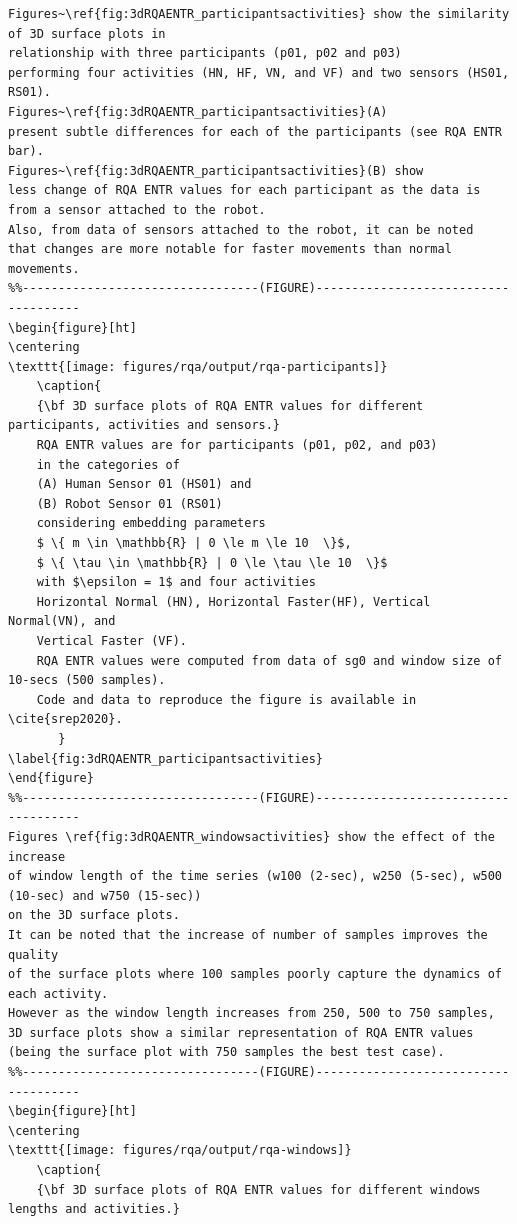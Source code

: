 \documentclass[10pt]{article}
\begin{document}
\begin{verbatim}
Figures~\ref{fig:3dRQAENTR_participantsactivities} show the similarity of 3D surface plots in 
relationship with three participants (p01, p02 and p03)
performing four activities (HN, HF, VN, and VF) and two sensors (HS01, RS01).
Figures~\ref{fig:3dRQAENTR_participantsactivities}(A) 
present subtle differences for each of the participants (see RQA ENTR bar). 
Figures~\ref{fig:3dRQAENTR_participantsactivities}(B) show 
less change of RQA ENTR values for each participant as the data is 
from a sensor attached to the robot. 
Also, from data of sensors attached to the robot, it can be noted 
that changes are more notable for faster movements than normal movements. 
%%---------------------------------(FIGURE)-------------------------------------
\begin{figure}[ht]
\centering
\texttt{[image: figures/rqa/output/rqa-participants]}
    \caption{
	{\bf 3D surface plots of RQA ENTR values for different participants, activities and sensors.}
	RQA ENTR values are for participants (p01, p02, and p03) 
	in the categories of 
	(A) Human Sensor 01 (HS01) and 
	(B) Robot Sensor 01 (RS01)
	considering embedding parameters
	$ \{ m \in \mathbb{R} | 0 \le m \le 10  \}$,
	$ \{ \tau \in \mathbb{R} | 0 \le \tau \le 10  \}$
	with $\epsilon = 1$ and four activities 
	Horizontal Normal (HN), Horizontal Faster(HF), Vertical Normal(VN), and 
	Vertical Faster (VF).
	RQA ENTR values were computed from data of sg0 and window size of 10-secs (500 samples).
	Code and data to reproduce the figure is available in \cite{srep2020}.
       }
\label{fig:3dRQAENTR_participantsactivities}
\end{figure}
%%---------------------------------(FIGURE)-------------------------------------
Figures \ref{fig:3dRQAENTR_windowsactivities} show the effect of the increase 
of window length of the time series (w100 (2-sec), w250 (5-sec), w500 (10-sec) and w750 (15-sec))
on the 3D surface plots. 
It can be noted that the increase of number of samples improves the quality 
of the surface plots where 100 samples poorly capture the dynamics of each activity.
However as the window length increases from 250, 500 to 750 samples, 
3D surface plots show a similar representation of RQA ENTR values 
(being the surface plot with 750 samples the best test case).
%%---------------------------------(FIGURE)-------------------------------------
\begin{figure}[ht]
\centering
\texttt{[image: figures/rqa/output/rqa-windows]}
    \caption{
	{\bf 3D surface plots of RQA ENTR values for different windows lengths and activities.}

\end{verbatim}
\end{document}
